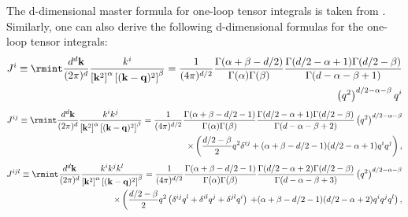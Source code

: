 The d-dimensional master formula for one-loop tensor integrals is taken from \cite{Levi:2011eq}. 
Similarly, one can also derive the following d-dimensional formulas for the one-loop tensor integrals: 
\begin{align}
\begin{split}
J^i\equiv\rmint \frac{d^d\bf{k}}{(2\pi)^d}\frac{k^i}{\left[{\bf{k}}^2\right]^\alpha\left[({\bf{k}-\bf{q}})^2\right]^\beta}=\frac{1}{(4\pi)^{d/2}}\frac{\Gamma(\alpha+\beta-d/2)}{\Gamma(\alpha)\Gamma(\beta)}\frac{\Gamma(d/2-\alpha+1)\Gamma(d/2-\beta)}{\Gamma(d-\alpha-\beta+1)}\\ \left(q^2\right)^{d/2-\alpha-\beta}q^i\end{split}
\end{align}
\begin{align}
\begin{split}
J^{ij}\equiv\rmint \frac{d^d\bf{k}}{(2\pi)^d}\frac{k^ik^j}{\left[{\bf{k}}^2\right]^\alpha\left[({\bf{k}-\bf{q}})^2\right]^\beta}=\frac{1}{(4\pi)^{d/2}}\frac{\Gamma(\alpha+\beta-d/2-1)}{\Gamma(\alpha)\Gamma(\beta)}\frac{\Gamma(d/2-\alpha+1)\Gamma(d/2-\beta)}{\Gamma(d-\alpha-\beta+2)}\left(q^2\right)^{d/2-\alpha-\beta}\\
\times\left(\frac{d/2-\beta}{2}q^2\delta^{ij}+(\alpha+\beta-d/2-1)(d/2-\alpha+1)q^iq^j\right),\end{split}
\end{align}
\begin{align}
\begin{split}
J^{ijl}\equiv\rmint \frac{d^d\bf{k}}{(2\pi)^d}\frac{k^ik^jk^l}{\left[{\bf{k}}^2\right]^\alpha\left[({\bf{k}-\bf{q}})^2\right]^\beta}=\frac{1}{(4\pi)^{d/2}}\frac{\Gamma(\alpha+\beta-d/2-1)}{\Gamma(\alpha)\Gamma(\beta)}\frac{\Gamma(d/2-\alpha+2)\Gamma(d/2-\beta)}{\Gamma(d-\alpha-\beta+3)}\left(q^2\right)^{d/2-\alpha-\beta} \\ 
\times\left(\frac{d/2-\beta}{2}q^2\left(\delta^{ij}q^l+\delta^{il}q^j+\delta^{jl}q^i\right)\right.  \left. 
+(\alpha+\beta-d/2-1)(d/2-\alpha+2)q^iq^jq^l\right),
\end{split}
\end{align}


